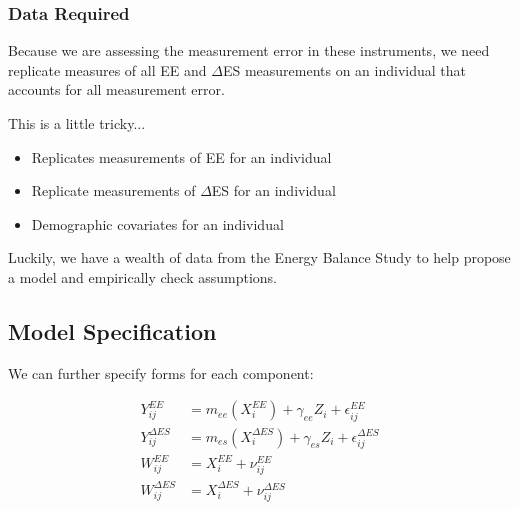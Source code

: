 \documentclass[handout]{beamer}\usepackage[]{graphicx}\usepackage[]{color}
\begin{document}
\begin{frame}
\frametitle{Data Required}

Because we are assessing the measurement error in these instruments, we need replicate measures of all EE and $\Delta$ES measurements on an individual that accounts for all measurement error.

This is a little tricky...
\begin{itemize}
\item
Replicates measurements of EE for an individual
\item
Replicate measurements of $\Delta$ES for an individual
\item
Demographic covariates for an individual
\end{itemize}

Luckily, we have a wealth of data from the Energy Balance Study to help propose a model and empirically check assumptions.

\end{frame}


\subsection{Model Specification}

\begin{frame}
We can further specify forms for each component:

\begin{align}
Y_{ij}^{EE} &= m_{ee}(X_i^{EE}) + \gamma_{ee}Z_i + \epsilon_{ij}^{EE} \\
Y_{ij}^{\Delta ES} &= m_{es}(X_i^{\Delta ES}) + \gamma_{es}Z_i + \epsilon_{ij}^{\Delta ES} \\
W_{ij}^{EE} &= X_i^{EE} + \nu_{ij}^{EE} \\
W_{ij}^{\Delta ES} &= X_i^{\Delta ES} + \nu_{ij}^{\Delta ES}
\end{align}

\end{frame}
\end{document}
